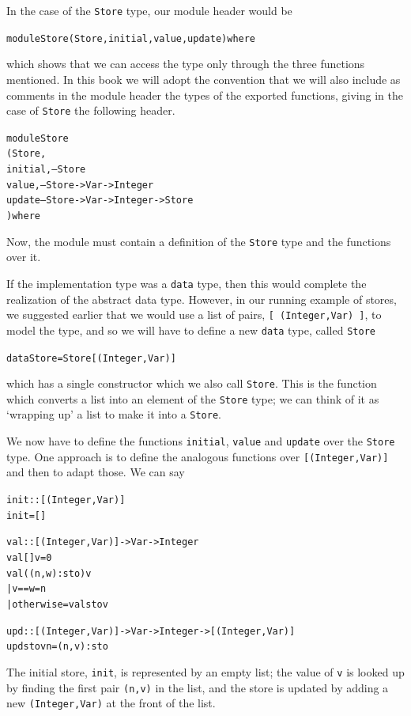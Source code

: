 In the case of the \texttt{Store} type, our module header would be
\begin{alltt}
module Store ( Store, initial, value, update ) where
\end{alltt}
which shows that we can access the type only through the three functions
mentioned. In this book we will adopt the convention that we will also
include as comments in the module header the types of the exported
functions, giving in the case of \texttt{Store} the following header.
\begin{alltt}
module Store 
   ( Store, 
     initial,     -- Store
     value,       -- Store -> Var -> Integer
     update       -- Store -> Var -> Integer -> Store
    ) where
\end{alltt}
Now, the module must contain a definition of the \texttt{Store} type and
the functions over it. 

If the implementation type was a \texttt{data} type, then this would
complete the realization of the abstract data type. However, in our running example of
stores, we
suggested earlier that we would use a list of
pairs, \texttt{[ (Integer,Var) ]}, to model the type, and so we will have to 
define a new
\texttt{data} type, called \texttt{Store}
\begin{alltt}
data Store = Store [ (Integer,Var) ] 
\end{alltt}
which has a single constructor which we also call \texttt{Store}. This
is the function which converts a list into an element of the
\texttt{Store} type; we can think of it as `wrapping up' a list to make
it into a \texttt{Store}.

We now have to define the functions \texttt{initial}, \texttt{value} and
\texttt{update} over the \texttt{Store} type. One approach is to define
the analogous functions over \texttt{[(Integer,Var)]} and then to adapt
those. We can say
\begin{alltt}
init :: [(Integer,Var)]
init = []
     
val :: [(Integer,Var)] -> Var -> Integer
val [] v        = 0
val ((n,w):sto) v 
  | v==w        = n
  | otherwise   = val sto v

upd :: [(Integer,Var)] -> Var -> Integer -> [(Integer,Var)]
upd sto v n   = (n,v):sto
\end{alltt}
The initial store, \texttt{init}, is represented by an empty list; the value of \texttt{v}
is looked up by finding the first pair \texttt{(n,v)} in the list, and
the store is updated by adding a new \texttt{(Integer,Var)} at the front of
the list.

